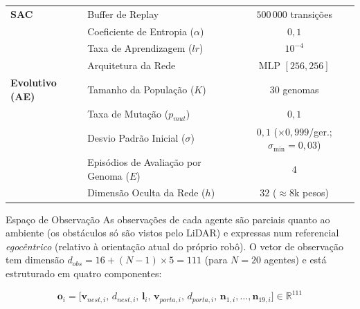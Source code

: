 \documentclass[12pt,reqno, twoside]{amsbook}
\makeatletter
\def\subsection{\@startsection{subsection}{2}%
      \z@{.5\linespacing\@plus.7\linespacing}{.25\linespacing}%
      {\normalfont\bfseries\flushleft}}
\theoremstyle{plain}
\numberwithin{equation}{chapter}
\numberwithin{section}{chapter}
\numberwithin{table}{chapter}
\numberwithin{figure}{chapter}
\makeatother
\begin{document}
\begin{table}[!htbp]
\begin{tabular}{|l|l|c|}
\textbf{SAC} & Buffer de Replay & $500\,000$ transições \\
 & Coeficiente de Entropia ($\alpha$) & $0{,}1$ \\
 & Taxa de Aprendizagem ($lr$) & $10^{-4}$ \\
 & Arquitetura da Rede & MLP $[256, 256]$ \\ \hline
\textbf{Evolutivo (AE)} & Tamanho da População ($K$) & $30$ genomas \\
 & Taxa de Mutação ($p_{mut}$) & $0{,}1$ \\
 & Desvio Padrão Inicial ($\sigma$) & $0{,}1$ ($\times 0{,}999$/ger.; $\sigma_{\min}=0{,}03$) \\
 & Episódios de Avaliação por Genoma ($E$) & $4$ \\
 & Dimensão Oculta da Rede ($h$) & $32$ ($\approx 8$k pesos) \\ \hline
\end{tabular}
\end{table}

\subsection{Espaço de Observação}
\label{sec:obs_space}
As observações de cada agente são parciais quanto ao ambiente (os obstáculos só são vistos pelo LiDAR) e expressas num referencial \emph{egocêntrico} (relativo à orientação atual do próprio robô). O vetor de observação tem dimensão $d_{obs} = 16 + (N-1) \times 5 = 111$ (para $N=20$ agentes) e está estruturado em quatro componentes:

\begin{equation}
    \mathbf{o}_i = \big[ \mathbf{v}_{nest, i}, \, d_{nest, i}, \, \mathbf{l}_i, \, \mathbf{v}_{porta, i}, \, d_{porta, i}, \, \mathbf{n}_{1, i}, \dots, \mathbf{n}_{19, i} \big] \in \mathbb{R}^{111}
\end{equation}
\end{document}

